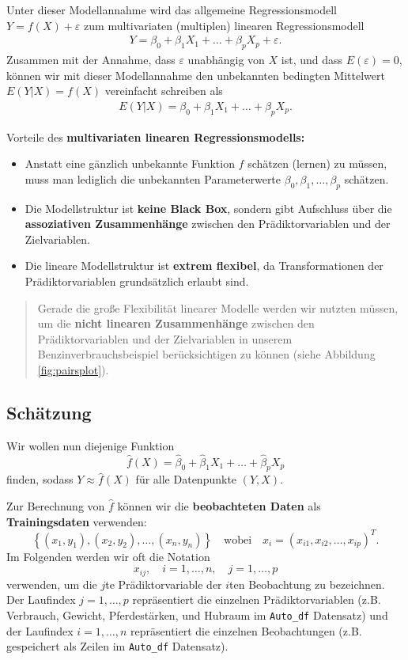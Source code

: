 \documentclass[
  ngerman,
]{book}
\providecommand{\tightlist}{%
  \setlength{\itemsep}{0pt}\setlength{\parskip}{0pt}}
\begin{document}
Unter dieser Modellannahme wird das allgemeine Regressionsmodell \(Y=f(X)+\varepsilon\) zum multivariaten (multiplen) linearen Regressionsmodell
\begin{align*}
Y=\beta_0+\beta_1X_1+\dots+\beta_pX_p+\varepsilon.
\end{align*}
Zusammen mit der Annahme, dass \(\varepsilon\) unabhängig von \(X\) ist, und dass \(E(\varepsilon)=0\), können wir mit dieser Modellannahme den unbekannten bedingten Mittelwert \(E(Y|X)=f(X)\) vereinfacht schreiben als
\begin{align*}
E(Y|X)=\beta_0+\beta_1X_1+\dots+\beta_pX_p.
\end{align*}

Vorteile des \textbf{multivariaten linearen Regressionsmodells:}

\begin{itemize}
\tightlist
\item
  Anstatt eine gänzlich unbekannte Funktion \(f\) schätzen (lernen) zu müssen, muss man lediglich die unbekannten Parameterwerte \(\beta_0, \beta_1, \dots, \beta_p\) schätzen.
\item
  Die Modellstruktur ist \textbf{keine Black Box}, sondern gibt Aufschluss über die \textbf{assoziativen Zusammenhänge} zwischen den Prädiktorvariablen und der Zielvariablen.
\item
  Die lineare Modellstruktur ist \textbf{extrem flexibel}, da Transformationen der Prädiktorvariablen grundsätzlich erlaubt sind.
\end{itemize}

\begin{quote}
Gerade die große Flexibilität linearer Modelle werden wir nutzten müssen, um die \textbf{nicht linearen Zusammenhänge} zwischen den Prädiktorvariablen und der Zielvariablen in unserem Benzinverbrauchsbeispiel berücksichtigen zu können (siehe Abbildung \ref{fig:pairsplot}).
\end{quote}

\hypertarget{schuxe4tzung}{%
\subsection{Schätzung}\label{schuxe4tzung}}

Wir wollen nun diejenige Funktion
\[
\hat{f}(X)=\hat{\beta}_0 + \hat{\beta}_1 X_1 + \dots + \hat{\beta}_p X_p
\]
finden, sodass \(Y\approx \hat{f}(X)\) für alle Datenpunkte \((Y,X)\).

Zur Berechnung von \(\hat{f}\) können wir die \textbf{beobachteten Daten} als \textbf{Trainingsdaten} verwenden:
\[
\left\{(x_1,y_1),(x_2,y_2),\dots,(x_n,y_n)\right\}\quad\text{wobei}\quad x_i=(x_{i1},x_{i2},\dots,x_{ip})^T.
\]
Im Folgenden werden wir oft die Notation
\[x_{ij},\quad i=1,\dots,n,\quad j=1,\dots,p\]
verwenden, um die \(j\)te Prädiktorvariable der \(i\)ten Beobachtung zu bezeichnen. Der Laufindex \(j=1,\dots,p\) repräsentiert die einzelnen Prädiktorvariablen (z.B. Verbrauch, Gewicht, Pferdestärken, und Hubraum im \texttt{Auto\_df} Datensatz) und der Laufindex \(i=1,\dots,n\) repräsentiert die einzelnen Beobachtungen (z.B. gespeichert als Zeilen im \texttt{Auto\_df} Datensatz).
\end{document}

